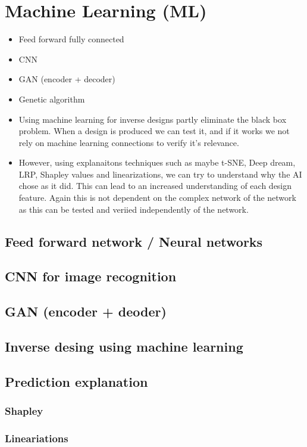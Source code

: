 \section{Machine Learning (ML)}
\begin{itemize}
  \item Feed forward fully connected
  \item CNN
  \item GAN (encoder + decoder)
  \item Genetic algorithm
  \item Using machine learning for inverse designs partly eliminate the black box problem. When a design is produced we can test it, and if it works we not rely on machine learning connections to verify it's relevance. 
  \item However, using explanaitons techniques such as maybe t-SNE, Deep dream, LRP, Shapley values and linearizations, we can try to understand why the AI chose as it did. This can lead to an increased understanding of each design feature. Again this is not dependent on the complex network of the network as this can be tested and veriied independently of the network. 
\end{itemize}

\subsection{Feed forward network / Neural networks}
\subsection{CNN for image recognition}
\subsection{GAN (encoder + deoder)}
\subsection{Inverse desing using machine learning}
\subsection{Prediction explanation}
\subsubsection{Shapley}
\subsubsection{Lineariations}

